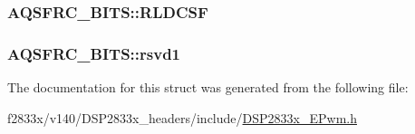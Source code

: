 \subsubsection[{R\+L\+D\+C\+S\+F}]{ A\+Q\+S\+F\+R\+C\+\_\+\+B\+I\+T\+S\+::\+R\+L\+D\+C\+S\+F}\label{struct_a_q_s_f_r_c___b_i_t_s_a02d6835af69c7330aa1d694c88005806}
\hypertarget{struct_a_q_s_f_r_c___b_i_t_s_a9ebf0b80bd7387ea41f97cf94c3e7d49}{}
\subsubsection[{rsvd1}]{ A\+Q\+S\+F\+R\+C\+\_\+\+B\+I\+T\+S\+::rsvd1}\label{struct_a_q_s_f_r_c___b_i_t_s_a9ebf0b80bd7387ea41f97cf94c3e7d49}


The documentation for this struct was generated from the following file\+:\begin{DoxyCompactItemize}
\item 
f2833x/v140/\+D\+S\+P2833x\+\_\+headers/include/\hyperlink{_d_s_p2833x___e_pwm_8h}{D\+S\+P2833x\+\_\+\+E\+Pwm.\+h}\end{DoxyCompactItemize}
